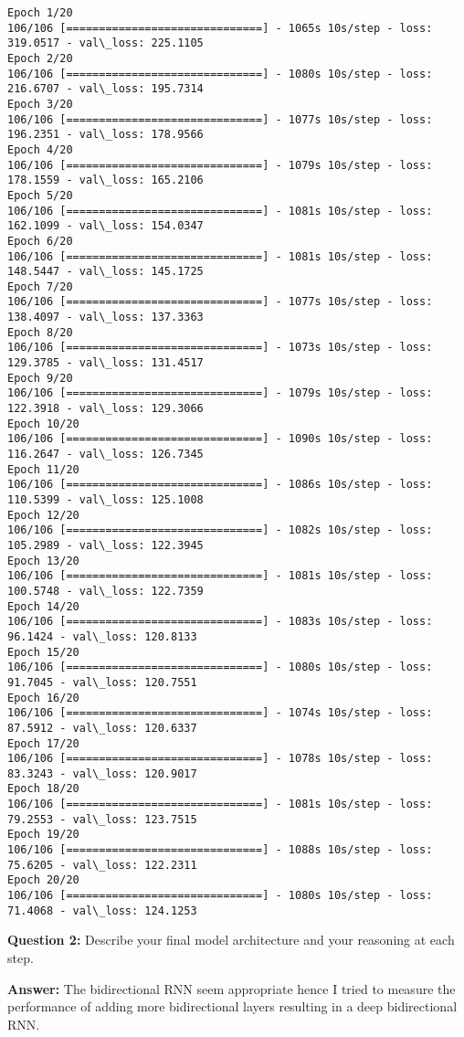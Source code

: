 \documentclass[11pt]{article}
\begin{document}
    \begin{Verbatim}[commandchars=\\\{\}]
Epoch 1/20
106/106 [==============================] - 1065s 10s/step - loss: 319.0517 - val\_loss: 225.1105
Epoch 2/20
106/106 [==============================] - 1080s 10s/step - loss: 216.6707 - val\_loss: 195.7314
Epoch 3/20
106/106 [==============================] - 1077s 10s/step - loss: 196.2351 - val\_loss: 178.9566
Epoch 4/20
106/106 [==============================] - 1079s 10s/step - loss: 178.1559 - val\_loss: 165.2106
Epoch 5/20
106/106 [==============================] - 1081s 10s/step - loss: 162.1099 - val\_loss: 154.0347
Epoch 6/20
106/106 [==============================] - 1081s 10s/step - loss: 148.5447 - val\_loss: 145.1725
Epoch 7/20
106/106 [==============================] - 1077s 10s/step - loss: 138.4097 - val\_loss: 137.3363
Epoch 8/20
106/106 [==============================] - 1073s 10s/step - loss: 129.3785 - val\_loss: 131.4517
Epoch 9/20
106/106 [==============================] - 1079s 10s/step - loss: 122.3918 - val\_loss: 129.3066
Epoch 10/20
106/106 [==============================] - 1090s 10s/step - loss: 116.2647 - val\_loss: 126.7345
Epoch 11/20
106/106 [==============================] - 1086s 10s/step - loss: 110.5399 - val\_loss: 125.1008
Epoch 12/20
106/106 [==============================] - 1082s 10s/step - loss: 105.2989 - val\_loss: 122.3945
Epoch 13/20
106/106 [==============================] - 1081s 10s/step - loss: 100.5748 - val\_loss: 122.7359
Epoch 14/20
106/106 [==============================] - 1083s 10s/step - loss: 96.1424 - val\_loss: 120.8133
Epoch 15/20
106/106 [==============================] - 1080s 10s/step - loss: 91.7045 - val\_loss: 120.7551
Epoch 16/20
106/106 [==============================] - 1074s 10s/step - loss: 87.5912 - val\_loss: 120.6337
Epoch 17/20
106/106 [==============================] - 1078s 10s/step - loss: 83.3243 - val\_loss: 120.9017
Epoch 18/20
106/106 [==============================] - 1081s 10s/step - loss: 79.2553 - val\_loss: 123.7515
Epoch 19/20
106/106 [==============================] - 1088s 10s/step - loss: 75.6205 - val\_loss: 122.2311
Epoch 20/20
106/106 [==============================] - 1080s 10s/step - loss: 71.4068 - val\_loss: 124.1253

    \end{Verbatim}

    \textbf{Question 2:} Describe your final model architecture and your
reasoning at each step.

\textbf{Answer:} The bidirectional RNN seem appropriate hence I tried to
measure the performance of adding more bidirectional layers resulting in
a deep bidirectional RNN.
\end{document}
